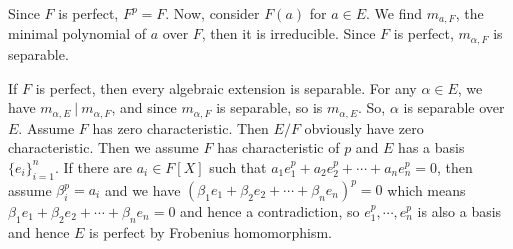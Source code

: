\documentclass[lang=en,11pt,a4paper,citestyle =authoryear]{elegantpaper}
\begin{document}
Since $F$ is perfect, $F^p=F$. Now, consider $F(a)$ for $a\in E$. We find $m_{a, F}$, the minimal polynomial of $a$ over $F$, then it is irreducible. Since $F$ is perfect, $m_{\alpha, F}$ is separable. \par
If $F$ is perfect, then every algebraic extension is separable. For any $\alpha\in E$, we have $m_{\alpha, E}\ |\ m_{\alpha, F}$, and since $m_{\alpha, F}$ is separable, so is $m_{\alpha, E}$. So, $\alpha$ is separable over $E$.
\fi
Assume $F$ has zero characteristic. Then $E/F$ obviously have zero characteristic. Then we assume $F$ has characteristic of $p$ and $E$ has a basis $\{e_i\}_{i=1}^n$. If there are $a_i \in F[X]$ such that $a_1e_1^p+a_2e_2^p+\cdots+a_ne_n^p = 0$, then assume $\beta_i^p = a_i$ and we have $(\beta_1e_1+\beta_2e_2+\cdots+\beta_ne_n)^p = 0$ which means $\beta_1e_1+\beta_2e_2+\cdots+\beta_ne_n = 0$ and hence a contradiction, so $e_1^p,\cdots,e_n^p$ is also a basis and hence $E$ is perfect by Frobenius homomorphism. 
\par 
\vspace{0.5em}


\addappheadtotoc
\end{document}
